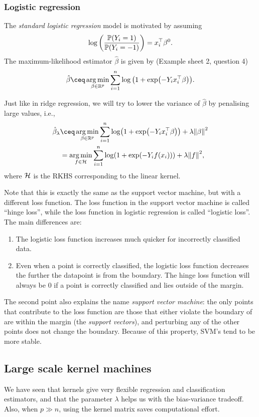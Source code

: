 \subsubsection{Logistic regression}
\begin{recap}
	The \emph{standard logistic regression} model is motivated by assuming 
	\[
	\log\qty(\frac{\mathbb P(Y_i = 1)}{\mathbb P(Y_i = -1)}) = x_i^\top \beta^0. 
	\]
	The maximum-likelihood estimator $\hat\beta$ is given by (Example sheet 2, question 4)
	\[
	\hat\beta \ceq \argmin_{\beta \in \RR^p} \sum_{i=1}^n \log\qty(1 + \exp(- Y_i x_i\T\beta)). 
	\]
\end{recap}

Just like in ridge regression, we will try to lower the variance of $\hat\beta$ by penalising large values, i.e.,
\begin{align*}
\hat\beta_\lambda &\ceq \argmin_{\beta \in \RR^p} \sum_{i=1}^n\log(1 + \exp(-Y_i x_i\T\beta)) + \lambda \norm{\beta}^2 \\
&= \argmin_{f \in \HH} \sum_{i=1}^n \log(1 + \exp(- Y_i f(x_i))) + \lambda \norm{f}^2,
\end{align*}
where $\mathcal H$ is the RKHS corresponding to the linear kernel. 

Note that this is exactly the same as the support vector machine, but with a different loss function. The loss function in the support vector machine is called ``hinge loss'', while the loss function in logistic regression is called ``logistic loss''. The main differences are:
\begin{enumerate}
	\item The logistic loss function increases much quicker for incorrectly classified data. 
	\item Even when a point is correctly classified, the logistic loss function decreases the further the datapoint is from the boundary. The hinge loss function will always be 0 if a point is correctly classified and lies outside of the margin.
\end{enumerate}

The second point also explains the name \emph{support vector machine}: the only points that contribute to the loss function are those that either violate the boundary of are within the margin (the \emph{support vectors}), and perturbing any of the other points does not change the boundary. Because of this property, SVM's tend to be more stable. 

\subsection{Large scale kernel machines}
We have seen that kernels give very flexible regression and classification estimators, and that the parameter $\lambda$ helps us with the bias-variance tradeoff. Also, when $p \gg n$, using the kernel matrix saves computational effort. 

